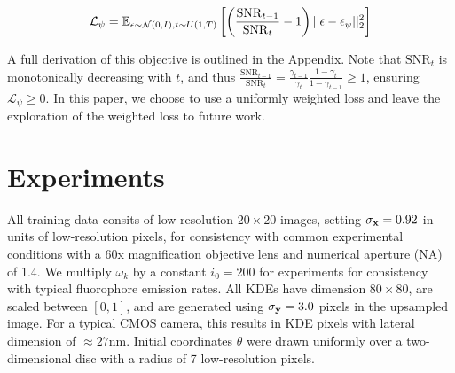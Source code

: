\documentclass{article}
\begin{document}
\begin{equation}
\mathcal{L}_{\psi} = \mathbb{E}_{\epsilon\sim \mathcal{N}(0,I),t\sim U(1,T)}\left[\left(\frac{\mathrm{SNR}_{t-1}}{{\mathrm{SNR}_{t}}}-1\right)\lvert\lvert \bold{\epsilon}-\bold{\epsilon}_{\psi}\lvert\lvert_{2}^{2}\right]
\end{equation}

A full derivation of this objective is outlined in the Appendix. Note that $\mathrm{SNR}_{t}$ is monotonically decreasing with $t$, and thus $\frac{\mathrm{SNR}_{t-1}}{{\mathrm{SNR}_{t}}} = \frac{\gamma_{t-1}}{\gamma_{t}}\frac{1-\gamma_{t}}{1-\gamma_{t-1}} \geq 1$, ensuring $\mathcal{L}_{\psi}\geq 0$. In this paper, we choose to use a uniformly weighted loss and leave the exploration of the weighted loss to future work.

\section{Experiments}

All training data consits of low-resolution $20\times 20$ images, setting $\sigma_{\bold{x}}=0.92$ in units of low-resolution pixels, for consistency with common experimental conditions with a 60x magnification objective lens and numerical aperture (NA) of 1.4. We multiply $\omega_{k}$ by a constant $i_{0}=200$ for experiments for consistency with typical fluorophore emission rates. All KDEs have dimension $80\times 80$, are scaled between $[0,1]$, and are generated using $\sigma_{\bold{y}}=3.0$ pixels in the upsampled image. For a typical CMOS camera, this results in KDE pixels with lateral dimension of $\approx 27\mathrm{nm}$. Initial coordinates $\theta$ were drawn uniformly over a two-dimensional disc with a radius of 7 low-resolution pixels.
\end{document}
